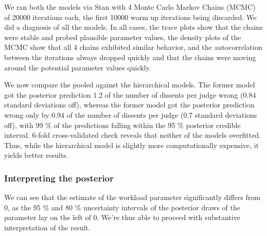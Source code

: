 \documentclass[
  11pt,
]{article}
\begin{document}
We ran both the models via Stan with 4 Monte Carlo Markov Chains (MCMC)
of 20000 iterations each, the first 10000 warm up iterations being
discarded. We did a diagnosis of all the models. In all cases, the trace
plots show that the chains were stable and probed plausible parameter
values, the density plots of the MCMC show that all 4 chains exhibited
similar behavior, and the autocorrelation between the iterations always
dropped quickly and that the chains were moving around the potential
parameter values quickly.

We now compare the pooled against the hierarchical models. The former
model got the posterior prediction 1.2 of the number of dissents per
judge wrong (0.84 standard deviations off), whereas the former model got
the posterior prediction wrong only by 0.94 of the number of dissents
per judge (0.7 standard deviations off), with 99 \% of the predictions
falling within the 95 \% posterior credible interval. 6-fold
cross-validated check reveals that neither of the models overfitted.
Thus, while the hierarchical model is slightly more computationally
expensive, it yields better results.

\hypertarget{interpreting-the-posterior}{%
\subsubsection{Interpreting the
posterior}\label{interpreting-the-posterior}}

We can see that the estimate of the workload parameter significantly
differs from 0, as the 95 \% and 80 \% uncertainty intervals of the
posterior draws of the parameter lay on the left of 0. We're thus able
to proceed with substantive interpretation of the result.
\end{document}
